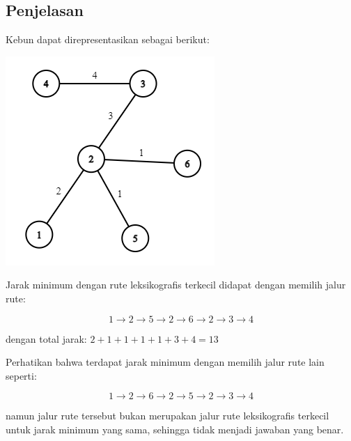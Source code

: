\documentclass{article}
\begin{document}
\pagebreak
\subsection*{Penjelasan}

Kebun dapat direpresentasikan sebagai berikut:

\begin{center}
\includegraphics[scale=0.8]{buah.png}
\end{center}

Jarak minimum dengan rute leksikografis terkecil didapat dengan memilih jalur rute:

$$1 \rightarrow 2 \rightarrow 5 \rightarrow 2 \rightarrow 6 \rightarrow 2 \rightarrow 3 \rightarrow 4$$

dengan total jarak: $2+1+1+1+1+3+4=13$

Perhatikan bahwa terdapat jarak minimum dengan memilih jalur rute lain seperti:

$$1 \rightarrow 2 \rightarrow 6 \rightarrow 2 \rightarrow 5 \rightarrow 2 \rightarrow 3 \rightarrow 4$$

namun jalur rute tersebut bukan merupakan jalur rute leksikografis terkecil untuk jarak minimum yang sama, sehingga tidak menjadi jawaban yang benar.

\pagebreak
\end{document}
